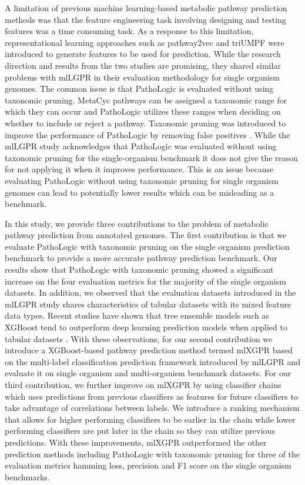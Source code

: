 \documentclass[sn-mathphys,Numbered]{sn-jnl}%
\theoremstyle{thmstyleone}%
\theoremstyle{thmstyletwo}%
\theoremstyle{thmstylethree}%
\begin{document}
A limitation of previous machine learning-based metabolic pathway prediction methods was that the feature engineering task involving designing and testing features was a time consuming task. 
As a response to this limitation, representational learning approaches \cite{bengioRepresentationLearningReview2013} such as pathway2vec \cite{mabasherLeveragingHeterogeneousNetwork2021} and triUMPF \cite{basherMetabolicPathwayPrediction2021} were introduced to generate features to be used for prediction.
While the research direction and results from the two studies are promising, they shared similar problems with mlLGPR in their evaluation methodology for single organism genomes.
The common issue is that PathoLogic is evaluated without using taxonomic pruning.
MetaCyc pathways can be assigned a taxonomic range for which they can occur and PathoLogic utilizes these ranges when deciding on whether to include or reject a pathway. 
Taxonomic pruning was introduced to improve the performance of PathoLogic by removing false positives \cite{karpPathwayToolsPathway2011}.
While the mlLGPR study acknowledges that PathoLogic was evaluated without using taxonomic pruning for the single-organism benchmark it does not give the reason for not applying it when it improves performance.
This is an issue because evaluating PathoLogic without using taxonomic pruning for single organism genomes can lead to potentially lower results which can be misleading as a benchmark.

In this study, we provide three contributions to the problem of metabolic pathway prediction from annotated genomes.
The first contribution is that we evaluate PathoLogic with taxonomic pruning on the single organism prediction benchmark to provide a more accurate pathway prediction benchmark.
Our results show that PathoLogic with taxonomic pruning showed a significant increase on the four evaluation metrics for the majority of the single organism datasets.
In addition, we observed that the evaluation datasets introduced in the mlLGPR study shares characteristics of tabular datasets with its mixed feature data types.
Recent studies have shown that tree ensemble models such as XGBoost tend to outperform deep learning prediction models when applied to tabular datasets \cite{shwartz-zivTabularDataDeep2022}\cite{grinsztajn2022tree}.
With these observations, for our second contribution we introduce a XGBoost-based pathway prediction method termed mlXGPR based on the multi-label classification prediction framework introduced by mlLGPR and evaluate it on single organism and multi-organism benchmark datasets.
For our third contribution, we further improve on mlXGPR by using classifier chains \cite{zhangBinaryRelevanceMultilabel2018} which uses predictions from previous classifiers as features for future classifiers to take advantage of correlations between labels.
We introduce a ranking mechanism that allows for higher performing classifiers to be earlier in the chain while lower performing classifiers are put later in the chain so they can utilize previous predictions.
With these improvements, mlXGPR outperformed the other prediction methods including PathoLogic with taxonomic pruning for three of the evaluation metrics hamming loss, precision and F1 score on the single organism benchmarks.
\end{document}

